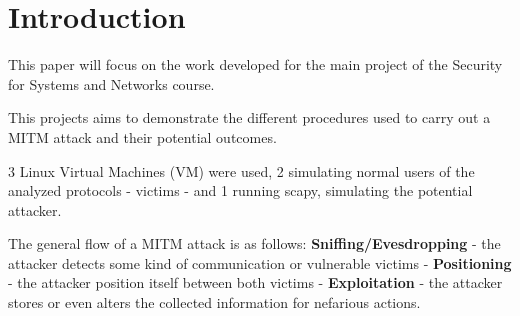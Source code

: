 \section{Introduction}
\label{sec:Intro}
This paper will focus on the work developed for the main project of the 
Security for Systems and Networks course.

This projects aims to demonstrate the different procedures used to carry out a 
MITM attack and their potential outcomes.

3 Linux Virtual Machines (VM) were used, 2 simulating normal users of the 
analyzed protocols - victims - and 1 running scapy, simulating the potential 
attacker.

The general flow of a MITM attack is as follows: \textbf{Sniffing/Evesdropping}
- the attacker detects some kind of communication or vulnerable victims - 
\textbf{Positioning} - the attacker position itself between both victims -
\textbf{Exploitation} - the attacker stores or even alters the collected 
information for nefarious actions.

